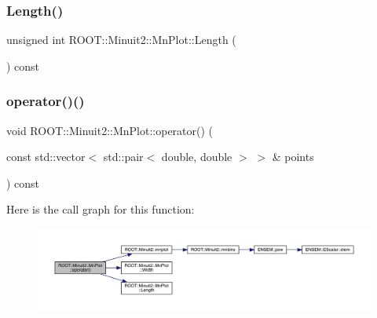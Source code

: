 \mbox{\label{classROOT_1_1Minuit2_1_1MnPlot_aefbe338659ecdac9b7ad160472a34221}} 
\subsubsection{\texorpdfstring{Length()}{Length()}\hspace{0.1cm}{\footnotesize\ttfamily [3/3]}}
{\footnotesize\ttfamily unsigned int R\+O\+O\+T\+::\+Minuit2\+::\+Mn\+Plot\+::\+Length (\begin{DoxyParamCaption}{ }\end{DoxyParamCaption}) const\hspace{0.3cm}{\ttfamily [inline]}}

\mbox{\label{classROOT_1_1Minuit2_1_1MnPlot_a118857899dee9d8222acc5c4926956ca}} 
\subsubsection{\texorpdfstring{operator()()}{operator()()}\hspace{0.1cm}{\footnotesize\ttfamily [1/6]}}
{\footnotesize\ttfamily void R\+O\+O\+T\+::\+Minuit2\+::\+Mn\+Plot\+::operator() (\begin{DoxyParamCaption}\item[{const std\+::vector$<$ std\+::pair$<$ double, double $>$ $>$ \&}]{points }\end{DoxyParamCaption}) const}

Here is the call graph for this function\+:
\nopagebreak
\begin{figure}[H]
\begin{center}
\leavevmode
\includegraphics[width=350pt]{d1/d62/classROOT_1_1Minuit2_1_1MnPlot_a118857899dee9d8222acc5c4926956ca_cgraph}
\end{center}
\end{figure}
\mbox{\label{classROOT_1_1Minuit2_1_1MnPlot_a118857899dee9d8222acc5c4926956ca}} 
